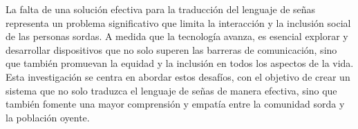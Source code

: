 La falta de una solución efectiva para la traducción del lenguaje de señas representa un problema significativo que limita la interacción y la inclusión social de las personas sordas. A medida que la tecnología avanza, es esencial explorar y desarrollar dispositivos que no solo superen las barreras de comunicación, sino que también promuevan la equidad y la inclusión en todos los aspectos de la vida. Esta investigación se centra en abordar estos desafíos, con el objetivo de crear un sistema que no solo traduzca el lenguaje de señas de manera efectiva, sino que también fomente una mayor comprensión y empatía entre la comunidad sorda y la población oyente.
